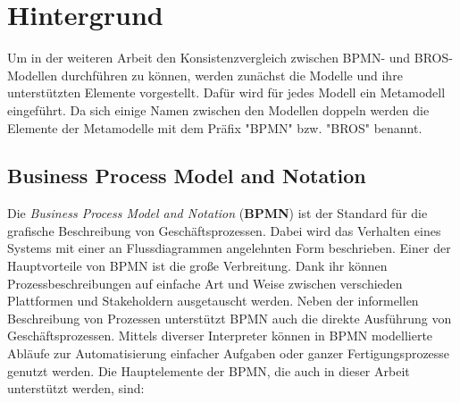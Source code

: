 \chapter{Hintergrund}
\label{chap:background}

Um in der weiteren Arbeit den Konsistenzvergleich zwischen BPMN- und BROS-Modellen durchführen zu können, werden zunächst die Modelle und ihre unterstützten Elemente vorgestellt.
Dafür wird für jedes Modell ein Metamodell eingeführt.
Da sich einige Namen zwischen den Modellen doppeln werden die Elemente der Metamodelle mit dem Präfix "BPMN" bzw. "BROS" benannt.

\section{Business Process Model and Notation}

Die \emph{Business Process Model and Notation} (\textbf{BPMN}) ist der Standard für die grafische Beschreibung von Geschäftsprozessen.
Dabei wird das Verhalten eines Systems mit einer an Flussdiagrammen angelehnten Form beschrieben.
Einer der Hauptvorteile von BPMN ist die große Verbreitung.
Dank ihr können Prozessbeschreibungen auf einfache Art und Weise zwischen verschieden Plattformen und Stakeholdern ausgetauscht werden.
Neben der informellen Beschreibung von Prozessen unterstützt BPMN auch die direkte Ausführung von Geschäftsprozessen.
Mittels diverser Interpreter können in BPMN modellierte Abläufe zur Automatisierung einfacher Aufgaben oder ganzer Fertigungsprozesse genutzt werden.
Die Hauptelemente der BPMN, die auch in dieser Arbeit unterstützt werden, sind:

